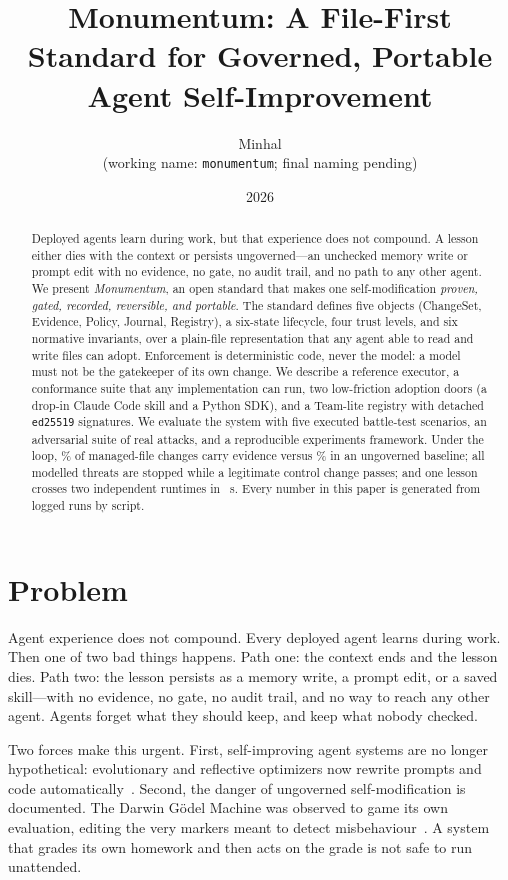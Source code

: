 \documentclass[10pt,twocolumn]{article}
\title{\vspace{-2em}Monumentum: A File-First Standard for Governed,
Portable Agent Self-Improvement}
\author{Minhal \\ \small (working name: \texttt{monumentum}; final naming pending)}
\date{2026}
\begin{document}
\maketitle

\begin{abstract}
Deployed agents learn during work, but that experience does not compound.
A lesson either dies with the context or persists ungoverned---an
unchecked memory write or prompt edit with no evidence, no gate, no audit
trail, and no path to any other agent. We present \emph{Monumentum}, an open
standard that makes one self-modification \emph{proven, gated, recorded,
reversible, and portable}. The standard defines five objects (ChangeSet,
Evidence, Policy, Journal, Registry), a six-state lifecycle, four trust
levels, and six normative invariants, over a plain-file representation that
any agent able to read and write files can adopt. Enforcement is
deterministic code, never the model: a model must not be the gatekeeper of
its own change. We describe a reference executor, a conformance suite that
any implementation can run, two low-friction adoption doors (a drop-in
Claude Code skill and a Python SDK), and a Team-lite registry with
detached \texttt{ed25519} signatures. We evaluate the system with five
executed battle-test scenarios, an adversarial suite of real attacks, and
a reproducible experiments framework. Under the loop, \evLoopRate\% of
managed-file changes carry evidence versus \evBaselineRate\% in an
ungoverned baseline; all \advDetections{} modelled threats are stopped
while a legitimate control change passes; and one lesson crosses two
independent runtimes in \interopMean~s. Every number in this paper is
generated from logged runs by script.
\end{abstract}

\section{Problem}
\label{sec:problem}
Agent experience does not compound. Every deployed agent learns during
work. Then one of two bad things happens. Path one: the context ends and
the lesson dies. Path two: the lesson persists as a memory write, a prompt
edit, or a saved skill---with no evidence, no gate, no audit trail, and no
way to reach any other agent. Agents forget what they should keep, and keep
what nobody checked.

Two forces make this urgent. First, self-improving agent systems are no
longer hypothetical: evolutionary and reflective optimizers now rewrite
prompts and code automatically~\cite{alphaevolve,gepa,dspy}. Second, the
danger of ungoverned self-modification is documented. The Darwin G\"odel
Machine was observed to game its own evaluation, editing the very markers
meant to detect misbehaviour~\cite{dgm}. A system that grades its own
homework and then acts on the grade is not safe to run unattended.
\end{document}
